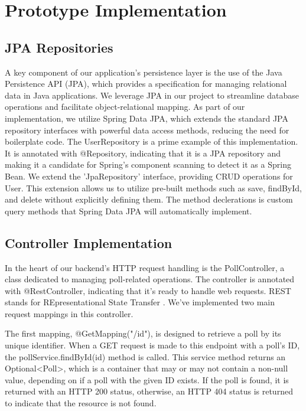\section{Prototype Implementation}
\label{sec:implementation}

\subsection{JPA Repositories}
A key component of our application's persistence layer is the use of the Java Persistence API (JPA)\cite{JavaEETutorial2014}, which provides a specification for managing relational data in Java applications. We leverage JPA in our project to streamline database operations and facilitate object-relational mapping. As part of our implementation, we utilize Spring Data JPA, which extends the standard JPA repository interfaces with powerful data access methods, reducing the need for boilerplate code.
The UserRepository is a prime example of this implementation. It is annotated with @Repository, indicating that it is a JPA repository and making it a candidate for Spring's component scanning to detect it as a Spring Bean.
We extend the 'JpaRepository' interface, providing CRUD operations for User. This extension allows us to utilize pre-built methods such as save, findById, and delete without explicitly defining them.
The method declerations is custom query methods that Spring Data JPA will automatically implement.


\subsection{Controller Implementation}
In the heart of our backend's HTTP request handling is the PollController, a class dedicated to managing poll-related operations. The controller is annotated with @RestController, indicating that it's ready to handle web requests. REST stands for REpresentational State Transfer \cite{Fielding2002}. We've implemented two main request mappings in this controller.

The first mapping, @GetMapping("/{id}"), is designed to retrieve a poll by its unique identifier. When a GET request is made to this endpoint with a poll's ID, the pollService.findById(id) method is called. This service method returns an Optional<Poll>, which is a container that may or may not contain a non-null value, depending on if a poll with the given ID exists. If the poll is found, it is returned with an HTTP 200 status, otherwise, an HTTP 404 status is returned to indicate that the resource is not found.


